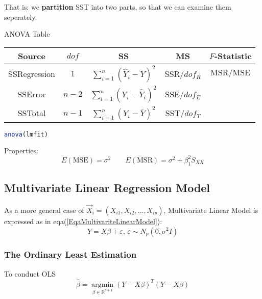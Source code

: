     That is: we \textbf{partition} SST into two parts, so that we can examine them seperately.
    

    \begin{point}
        ANOVA Table
    \end{point}
    
        \begin{table}[H]
            \centering
            \renewcommand\arraystretch{1}
            \begin{tabular}{c|cccc}
                \hline
                Source&$ dof $&SS&MS&$ F $-Statistic\\\hline
                SSRegression&$ 1 $&$ \sum_{i=1}^n(\hat{Y}_i-\bar{Y})^2  $&SSR/$ dof_R $& $ \mathrm{MSR}/\mathrm{MSE} $\\
                SSError&$ n-2 $&$ \sum_{i=1}^n(Y_i-\hat{Y}_i)^2  $&SSE/$ dof_E $& \\
                SSTotal&$ n-1 $&$ \sum_{i=1}^n(Y_i-\bar{Y})^2  $&SST/$ dof_T $& \\
                \hline
            \end{tabular}
        \end{table}
    \begin{rcode}
        \begin{lstlisting}[language=R]
    anova(lmfit)
        \end{lstlisting}
    \end{rcode}    





Properties:
\begin{equation}
    E(\mathrm{MSE})=\sigma ^2\qquad E(\mathrm{MSR})=\sigma ^2+\beta _1^2S_{XX} 
\end{equation}



\subsection{Multivariate Linear Regression Model}\label{SubSectionMultivariateLinearRegressionModel}
    As a more general case of $ \vec{X}_i=(X_{i1},X_{i2},\ldots,X_{ip})  $, Multivariate Linear Model is expressed as in eqa(\ref{EqaMultivariteLinearModel}):
    \[
        Y=X\beta +\varepsilon ,\,\varepsilon \sim N_p(0,\sigma ^2I) 
    \]


\subsubsection{The Ordinary Least Estimation}
    To conduct OLS
    \begin{equation}
        \hat{\beta }=\mathop{ \arg\min }\limits_{\beta \in \mathbb{R}^{p+1} } (Y-X\beta )^T(Y-X\beta )
    \end{equation}
    
